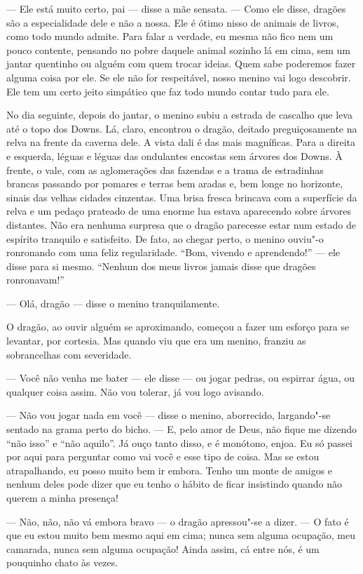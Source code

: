 --- Ele está muito certo, pai --- disse a mãe sensata. --- Como ele disse,
dragões são a especialidade dele e não a nossa. Ele é ótimo nisso de
animais de livros, como todo mundo admite. Para falar a verdade, eu
mesma não fico nem um pouco contente, pensando no pobre daquele
animal sozinho lá em cima, sem um jantar quentinho ou alguém com quem
trocar ideias. Quem sabe poderemos fazer alguma coisa por ele. Se
ele não for respeitável, nosso menino vai logo descobrir. Ele tem um
certo jeito simpático que faz todo mundo contar tudo para ele.

No dia seguinte, depois do jantar, o menino subiu a estrada de
cascalho que leva até o topo dos Downs. Lá, claro, encontrou o
dragão, deitado preguiçosamente na relva na frente da caverna dele. A
vista dali é das mais magníficas. Para a direita e esquerda, léguas e
léguas das ondulantes encostas sem árvores dos Downs. À frente, o
vale, com as aglomerações das fazendas e a trama de estradinhas
brancas passando por pomares e terras bem aradas e, bem longe no
horizonte, sinais das velhas cidades cinzentas. Uma brisa fresca
brincava com a superfície da relva e um pedaço prateado de uma enorme
lua estava aparecendo sobre árvores distantes. Não era nenhuma
surpresa que o dragão parecesse estar num estado de espírito
tranquilo e satisfeito. De fato, ao chegar perto, o menino ouviu"-o
ronronando com uma feliz regularidade. “Bom, vivendo e aprendendo!” --- 
ele disse para si mesmo. “Nenhum dos meus livros jamais disse que
dragões ronronavam!” 

--- Olá, dragão --- disse o menino tranquilamente.

O dragão, ao ouvir alguém se aproximando, começou a fazer um esforço
para se levantar, por cortesia. Mas quando viu que era um menino,
franziu as sobrancelhas com severidade.

--- Você não venha me bater --- ele disse --- ou jogar pedras, ou espirrar
água, ou qualquer coisa assim. Não vou tolerar, já vou logo avisando.

--- Não vou jogar nada em você --- disse o menino, aborrecido, largando"-se
sentado na grama perto do bicho. --- E, pelo amor de Deus, não fique me
dizendo “não isso” e “não aquilo”. Já ouço tanto disso, e é
monótono, enjoa. Eu só passei por aqui para perguntar como vai você e
esse tipo de coisa. Mas se estou atrapalhando, eu posso muito bem ir
embora. Tenho um monte de amigos e nenhum deles pode dizer que eu
tenho o hábito de ficar insistindo quando não querem a minha
presença!

--- Não, não, não vá embora bravo --- o dragão apressou"-se a dizer. --- O
fato é que eu estou muito bem mesmo aqui em cima; nunca sem alguma
ocupação, meu camarada, nunca sem alguma ocupação! Ainda assim, cá
entre nós, é um pouquinho chato às vezes.

